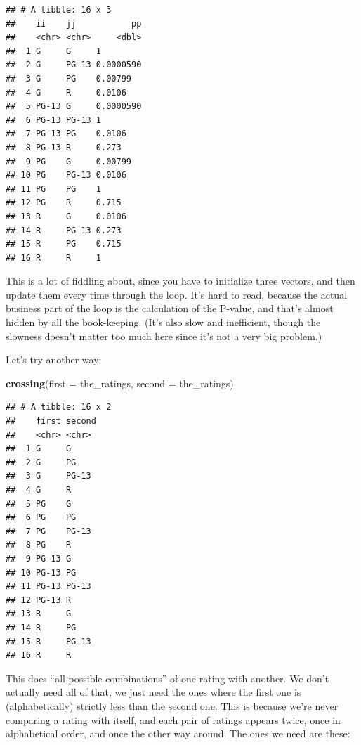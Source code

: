 \documentclass[]{tufte-book}
\newenvironment{Shaded}{}{}
\newcommand{\DataTypeTok}[1]{\textcolor[rgb]{0.56,0.13,0.00}{#1}}
\newcommand{\KeywordTok}[1]{\textcolor[rgb]{0.00,0.44,0.13}{\textbf{#1}}}
\newcommand{\NormalTok}[1]{#1}
\newcommand{\OperatorTok}[1]{\textcolor[rgb]{0.40,0.40,0.40}{#1}}
\newcommand{\StringTok}[1]{\textcolor[rgb]{0.25,0.44,0.63}{#1}}
\theoremstyle{definition}
\theoremstyle{definition}
\theoremstyle{definition}
\theoremstyle{remark}
\begin{document}
\begin{verbatim}
## # A tibble: 16 x 3
##    ii    jj           pp
##    <chr> <chr>     <dbl>
##  1 G     G     1        
##  2 G     PG-13 0.0000590
##  3 G     PG    0.00799  
##  4 G     R     0.0106   
##  5 PG-13 G     0.0000590
##  6 PG-13 PG-13 1        
##  7 PG-13 PG    0.0106   
##  8 PG-13 R     0.273    
##  9 PG    G     0.00799  
## 10 PG    PG-13 0.0106   
## 11 PG    PG    1        
## 12 PG    R     0.715    
## 13 R     G     0.0106   
## 14 R     PG-13 0.273    
## 15 R     PG    0.715    
## 16 R     R     1
\end{verbatim}

This is a lot of fiddling about, since you have to initialize three
vectors, and then update them every time through the loop. It's hard to
read, because the actual business part of the loop is the calculation of
the P-value, and that's almost hidden by all the book-keeping. (It's
also slow and inefficient, though the slowness doesn't matter too much
here since it's not a very big problem.)

Let's try another way:

\begin{Shaded}
\begin{Highlighting}[]
\KeywordTok{crossing}\NormalTok{(}\DataTypeTok{first =}\NormalTok{ the_ratings, }\DataTypeTok{second =}\NormalTok{ the_ratings)}
\end{Highlighting}
\end{Shaded}

\begin{verbatim}
## # A tibble: 16 x 2
##    first second
##    <chr> <chr> 
##  1 G     G     
##  2 G     PG    
##  3 G     PG-13 
##  4 G     R     
##  5 PG    G     
##  6 PG    PG    
##  7 PG    PG-13 
##  8 PG    R     
##  9 PG-13 G     
## 10 PG-13 PG    
## 11 PG-13 PG-13 
## 12 PG-13 R     
## 13 R     G     
## 14 R     PG    
## 15 R     PG-13 
## 16 R     R
\end{verbatim}

This does ``all possible combinations'' of one rating with another. We
don't actually need all of that; we just need the ones where the first
one is (alphabetically) strictly less than the second one. This is
because we're never comparing a rating with itself, and each pair of
ratings appears twice, once in alphabetical order, and once the other
way around. The ones we need are these:

\begin{Shaded}
\end{Shaded}
\end{document}
